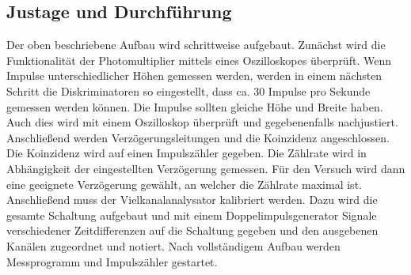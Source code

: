 \subsection{Justage und Durchführung}
Der oben beschriebene Aufbau wird schrittweise aufgebaut. 
Zunächst wird die Funktionalität der Photomultiplier mittels eines Oszilloskopes überprüft.
Wenn Impulse unterschiedlicher Höhen gemessen werden, werden in einem nächsten Schritt die Diskriminatoren 
so eingestellt, dass ca. 30 Impulse pro Sekunde gemessen werden können. Die Impulse sollten gleiche Höhe 
und Breite haben. Auch dies wird mit einem Oszilloskop überprüft und gegebenenfalls nachjustiert.
Anschließend werden Verzögerungsleitungen und die Koinzidenz angeschlossen. Die Koinzidenz wird auf einen Impulszähler 
gegeben. Die Zählrate wird in Abhängigkeit der eingestellten Verzögerung gemessen.
Für den Versuch wird dann eine geeignete Verzögerung gewählt, an welcher die Zählrate maximal ist.
Anschließend muss der Vielkanalanalysator kalibriert werden. Dazu wird die gesamte Schaltung aufgebaut und 
mit einem Doppelimpulsgenerator Signale verschiedener Zeitdifferenzen auf die Schaltung gegeben und den ausgebenen
Kanälen zugeordnet und notiert.
Nach vollständigem Aufbau werden Messprogramm und Impulszähler gestartet.



